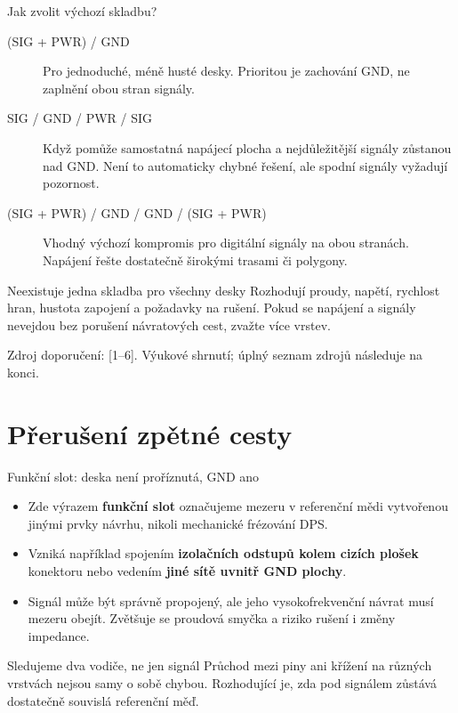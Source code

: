 \documentclass{beamer}
\begin{document}
\begin{frame}[t]{Jak zvolit výchozí skladbu?}
	\small
	\begin{description}
		\item[(SIG + PWR) / GND] Pro jednoduché, méně husté desky. Prioritou je zachování GND, ne zaplnění obou stran signály.
		\item[SIG / GND / PWR / SIG] Když pomůže samostatná napájecí plocha a nejdůležitější signály zůstanou nad GND. Není to automaticky chybné řešení, ale spodní signály vyžadují pozornost.
		\item[(SIG + PWR) / GND / GND / (SIG + PWR)] Vhodný výchozí kompromis pro digitální signály na obou stranách. Napájení řešte dostatečně širokými trasami či polygony.
	\end{description}
	\begin{block}{Neexistuje jedna skladba pro všechny desky}
	Rozhodují proudy, napětí, rychlost hran, hustota zapojení a požadavky na rušení. Pokud se napájení a signály nevejdou bez porušení návratových cest, zvažte více vrstev.
	\end{block}
	\vfill
	{\tiny Zdroj doporučení: [1--6]. Výukové shrnutí; úplný seznam zdrojů následuje na konci.}
\end{frame}

\section{\texorpdfstring{Přerušení zpětné cesty}{Preruseni zpetne cesty}}
\begin{frame}[t]{Funkční slot: deska není proříznutá, GND ano}
	\small
	\begin{itemize}
		\item Zde výrazem \textbf{funkční slot} označujeme mezeru v referenční mědi vytvořenou jinými prvky návrhu, nikoli mechanické frézování DPS.
		\item Vzniká například spojením \textbf{izolačních odstupů kolem cizích plošek} konektoru nebo vedením \textbf{jiné sítě uvnitř GND plochy}.
		\item Signál může být správně propojený, ale jeho vysokofrekvenční návrat musí mezeru obejít. Zvětšuje se proudová smyčka a riziko rušení i změny impedance.
	\end{itemize}
	\begin{block}{Sledujeme dva vodiče, ne jen signál}
	Průchod mezi piny ani křížení na různých vrstvách nejsou samy o sobě chybou. Rozhodující je, zda pod signálem zůstává dostatečně souvislá referenční měď.
	\end{block}
\end{frame}
\end{document}
